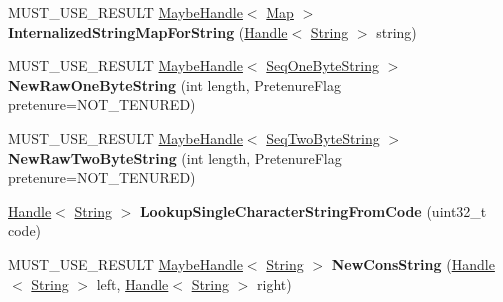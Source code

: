 \begin{DoxyCompactItemize}
\item 
\hypertarget{classv8_1_1internal_1_1_v8___f_i_n_a_l_aac76d6c312795dea4427da8fd95f246f}{}M\+U\+S\+T\+\_\+\+U\+S\+E\+\_\+\+R\+E\+S\+U\+L\+T \hyperlink{classv8_1_1internal_1_1_maybe_handle}{Maybe\+Handle}$<$ \hyperlink{classv8_1_1internal_1_1_map}{Map} $>$ {\bfseries Internalized\+String\+Map\+For\+String} (\hyperlink{classv8_1_1internal_1_1_handle}{Handle}$<$ \hyperlink{classv8_1_1internal_1_1_string}{String} $>$ string)\label{classv8_1_1internal_1_1_v8___f_i_n_a_l_aac76d6c312795dea4427da8fd95f246f}

\item 
\hypertarget{classv8_1_1internal_1_1_v8___f_i_n_a_l_ad13c3a600517881748eed35bceb989fc}{}M\+U\+S\+T\+\_\+\+U\+S\+E\+\_\+\+R\+E\+S\+U\+L\+T \hyperlink{classv8_1_1internal_1_1_maybe_handle}{Maybe\+Handle}$<$ \hyperlink{classv8_1_1internal_1_1_seq_one_byte_string}{Seq\+One\+Byte\+String} $>$ {\bfseries New\+Raw\+One\+Byte\+String} (int length, Pretenure\+Flag pretenure=N\+O\+T\+\_\+\+T\+E\+N\+U\+R\+E\+D)\label{classv8_1_1internal_1_1_v8___f_i_n_a_l_ad13c3a600517881748eed35bceb989fc}

\item 
\hypertarget{classv8_1_1internal_1_1_v8___f_i_n_a_l_a3d477576930628b118e16e1d8feafc10}{}M\+U\+S\+T\+\_\+\+U\+S\+E\+\_\+\+R\+E\+S\+U\+L\+T \hyperlink{classv8_1_1internal_1_1_maybe_handle}{Maybe\+Handle}$<$ \hyperlink{classv8_1_1internal_1_1_seq_two_byte_string}{Seq\+Two\+Byte\+String} $>$ {\bfseries New\+Raw\+Two\+Byte\+String} (int length, Pretenure\+Flag pretenure=N\+O\+T\+\_\+\+T\+E\+N\+U\+R\+E\+D)\label{classv8_1_1internal_1_1_v8___f_i_n_a_l_a3d477576930628b118e16e1d8feafc10}

\item 
\hypertarget{classv8_1_1internal_1_1_v8___f_i_n_a_l_a497c48a9acd7e6b8d7d6bd31e7bf52c6}{}\hyperlink{classv8_1_1internal_1_1_handle}{Handle}$<$ \hyperlink{classv8_1_1internal_1_1_string}{String} $>$ {\bfseries Lookup\+Single\+Character\+String\+From\+Code} (uint32\+\_\+t code)\label{classv8_1_1internal_1_1_v8___f_i_n_a_l_a497c48a9acd7e6b8d7d6bd31e7bf52c6}

\item 
\hypertarget{classv8_1_1internal_1_1_v8___f_i_n_a_l_a834c5f809f8939ce272842eb7f3c5aaf}{}M\+U\+S\+T\+\_\+\+U\+S\+E\+\_\+\+R\+E\+S\+U\+L\+T \hyperlink{classv8_1_1internal_1_1_maybe_handle}{Maybe\+Handle}$<$ \hyperlink{classv8_1_1internal_1_1_string}{String} $>$ {\bfseries New\+Cons\+String} (\hyperlink{classv8_1_1internal_1_1_handle}{Handle}$<$ \hyperlink{classv8_1_1internal_1_1_string}{String} $>$ left, \hyperlink{classv8_1_1internal_1_1_handle}{Handle}$<$ \hyperlink{classv8_1_1internal_1_1_string}{String} $>$ right)\label{classv8_1_1internal_1_1_v8___f_i_n_a_l_a834c5f809f8939ce272842eb7f3c5aaf}


\end{DoxyCompactItemize}
